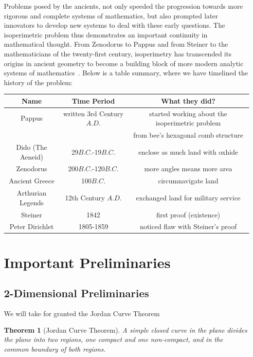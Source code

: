 \documentclass[a4paper]{book}
\newtheorem{theorem}{Theorem}%
\numberwithin{theorem}{section}%
\begin{document}
Problems posed by the ancients, not only speeded the progression towards more rigorous and complete systems of mathematics, but also prompted later innovators to develop new systems to deal with these early questions. The isoperimetric problem thus demonstrates an important continuity in mathematical thought. From Zenodorus to Pappus and from Steiner to the mathematicians of the twenty-first century, isoperimetry has transcended its origins in ancient geometry to become a building block of more modern analytic systems of mathematics~\citep{wiegert2010sagacity}. Below is a table summary, where we have timelined the history of the problem:
\begin{center}
    \begin{tabular}{||c c c||} 
        \hline
        Name & Time Period & What they did? \\ [0.5ex] 
        \hline
        Pappus & written 3rd Century $A.D.$ & started working about the isoperimetric problem \\ && from bee's hexagonal comb structure  \\ 
        \hline
        Dido (The Aeneid) & 29$B.C.$-19$B.C.$ & enclose as much land with oxhide \\
        \hline
        Zenodorus & 200$B.C.$-120$B.C.$ & more angles means more area \\
        \hline
        Ancient Greece & 100$B.C.$ & circumnavigate land \\
        \hline
        Arthurian Legends & 12th Century $A.D.$ & exchanged land for military service \\
        \hline
        Steiner & 1842 & first proof (existence) \\ 
        \hline
        Peter Dirichlet & 1805-1859 & noticed flaw with Steiner's proof \\ [1ex]
        \hline
    \end{tabular}
\end{center}

\section{Important Preliminaries}
\subsection{2-Dimensional Preliminaries}
We will take for granted the Jordan Curve Theorem
\begin{theorem}[Jordan Curve Theorem]
    A simple closed curve in the plane divides the plane into two regions, one compact and one non-compact, and in the common boundary of both regions.
\end{theorem} 
\end{document}
